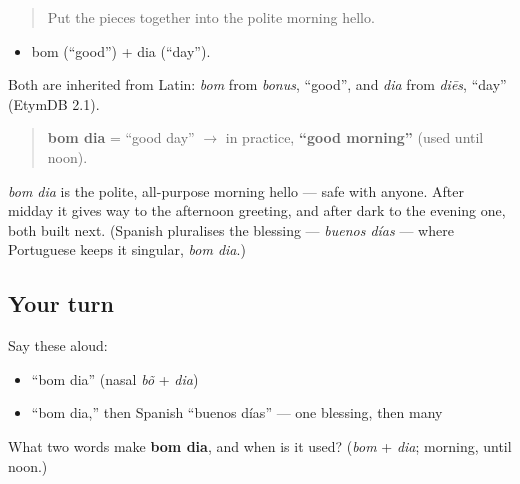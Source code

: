 \label{lesson:PT-C01-bom-dia}



\begin{quote}
Put the pieces together into the polite morning hello.
\end{quote}

\begin{cousinweb}
\begin{itemize}
\raggedright
  \item bom (\textquotedblleft{}good\textquotedblright{}) + dia (\textquotedblleft{}day\textquotedblright{}).
\end{itemize}

Both are inherited from Latin: \emph{bom} from \emph{bonus}, \textquotedblleft{}good\textquotedblright{}, and \emph{dia} from \emph{diēs}, \textquotedblleft{}day\textquotedblright{} (EtymDB 2.1).

\begin{quote}
\textbf{bom dia} = \textquotedblleft{}good day\textquotedblright{} $\to$ in practice, \textbf{\textquotedblleft{}good morning\textquotedblright{}} (used until noon).
\end{quote}
\end{cousinweb}

\begin{culture}
\emph{bom dia} is the polite, all-purpose morning hello — safe with anyone. After midday it gives way to the afternoon greeting, and after dark to the evening one, both built next. (Spanish pluralises the blessing — \emph{buenos días} — where Portuguese keeps it singular, \emph{bom dia}.)
\end{culture}

\subsection*{Your turn}
Say these aloud:

\begin{itemize}
\raggedright
  \item \textquotedblleft{}bom dia\textquotedblright{} (nasal \emph{bõ} + \emph{dia})
  \item \textquotedblleft{}bom dia,\textquotedblright{} then Spanish \textquotedblleft{}buenos días\textquotedblright{} — one blessing, then many
\end{itemize}

\begin{tcolorbox}[breakable,colback=teal!4,colframe=teal!35!black,title={Before you move on}]
What two words make \textbf{bom dia}, and when is it used? (\emph{bom} + \emph{dia}; morning, until noon.)
\end{tcolorbox}
